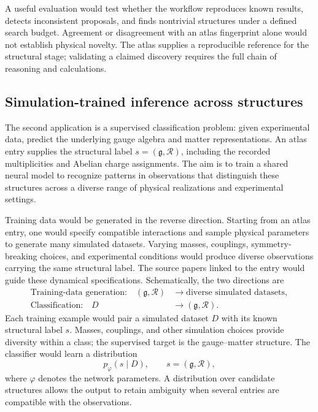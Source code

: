 A useful evaluation would test whether the workflow reproduces known results, detects inconsistent proposals, and finds nontrivial structures under a defined search budget. Agreement or disagreement with an atlas fingerprint alone would not establish physical novelty. The atlas supplies a reproducible reference for the structural stage; validating a claimed discovery requires the full chain of reasoning and calculations.

\subsection{Simulation-trained inference across structures}

The second application is a supervised classification problem: given experimental data, predict the underlying gauge algebra and matter representations. An atlas entry supplies the structural label $s=(\mathfrak g,\mathcal R)$, including the recorded multiplicities and Abelian charge assignments. The aim is to train a shared neural model to recognize patterns in observations that distinguish these structures across a diverse range of physical realizations and experimental settings.

Training data would be generated in the reverse direction. Starting from an atlas entry, one would specify compatible interactions and sample physical parameters to generate many simulated datasets. Varying masses, couplings, symmetry-breaking choices, and experimental conditions would produce diverse observations carrying the same structural label. The source papers linked to the entry would guide these dynamical specifications. Schematically, the two directions are
\begin{align}
\text{Training-data generation:}\quad
(\mathfrak g,\mathcal R)
&\longrightarrow \text{diverse simulated datasets},
\label{eq:simulation-training}\\
\text{Classification:}\quad
D &\longrightarrow (\mathfrak g,\mathcal R).
\label{eq:inference}
\end{align}
Each training example would pair a simulated dataset $D$ with its known structural label $s$. Masses, couplings, and other simulation choices provide diversity within a class; the supervised target is the gauge--matter structure. The classifier would learn a distribution
\begin{equation}
p_{\varphi}(s\mid D),\qquad s=(\mathfrak g,\mathcal R),
\end{equation}
where $\varphi$ denotes the network parameters. A distribution over candidate structures allows the output to retain ambiguity when several entries are compatible with the observations.

